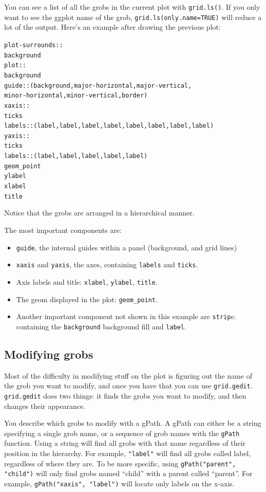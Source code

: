 
You can see a list of all the grobs in the current plot with {\tt grid.ls()}.  If you only want to see the ggplot name of the grob, {\tt grid.ls(only.name=TRUE)} will reduce a lot of the output.  Here's an example after drawing the previous plot:

\begin{alltt}
plot-surrounds::
 background
 plot::
  background
  guide:: (background, major-horizontal, major-vertical, 
           minor-horizontal, minor-vertical, border)
  xaxis::
   ticks
   labels:: (label, label, label, label, label, label, label, label)
  yaxis::
   ticks
   labels:: (label, label, label, label, label)
  geom_point
 ylabel
 xlabel
 title
\end{alltt}

Notice that the grobs are arranged in a hierarchical manner. 

The most important components are:

\begin{itemize}
  \item {\tt guide}, the internal guides within a panel (background, and grid lines)

  \item {\tt xaxis} and {\tt yaxis}, the axes, containing {\tt labels} and {\tt ticks}.

	\item Axis labels and title: {\tt xlabel}, {\tt ylabel}, {\tt title}.

  \item The geom displayed in the plot: {\tt geom\_point}.

	\item Another important component not shown in this example are {\tt strip}s: containing the {\tt background} background fill and {\tt label}.

\end{itemize}

\subsection{Modifying grobs}

Most of the difficulty in modifying stuff on the plot is figuring out the name of the grob you want to modify, and once you have that you can use {\tt grid.gedit}.  {\tt grid.gedit} does two things: it finds the grobs you want to modify, and then changes their appearance.  

You describe which grobs to modify with a gPath.  A gPath can either be a string specifying a single grob name, or a sequence of grob names with the {\tt gPath} function.  Using a string will find all grobs with that name regardless of their position in the hierarchy.  For example, {\tt "label"} will find all grobs called label, regardless of where they are.  To be more specific, using {\tt gPath("parent", "child")} will only find grobs named ``child'' with a parent called ``parent''.  For example, {\tt gPath("xaxis", "label")} will locate only labels on the x-axis.

